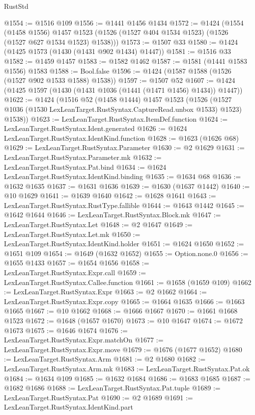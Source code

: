 \begin{lexlean}{RustStd}
\begin{coremodule}
@1554 := @1516 @109
@1556 := @1441 @1456 @1434
@1572 := @1424
    (@1554
      (@1458 @1556)
      @1457
      @1523
      (@1526 (@1527 @404 @1534 @1523) (@1526 (@1527 @627 @1534 @1523) @1538)))
@1573 := @1507 @33
@1580 := @1424 (@1425 @1573 (@1430 (@1431 @902 @1434) @1447))
@1581 := @1516 @33
@1582 := @1459 @1457
@1583 := @1582 @1462
@1587 := @1581 (@1441 @1583 @1556) @1583
@1588 := Bool.false
@1596 := @1424 (@1587 @1588 (@1526 (@1527 @902 @1533 @1588) @1538))
@1597 := @1507 @52
@1607 := @1424 (@1425 @1597 (@1430 (@1431 @1036 (@1441 (@1471 @1456) @1434)) @1447))
@1622 := @1424
    (@1516
      @52
      (@1458 @1444)
      @1457
      @1523
      (@1526 (@1527 @1036 (@1530 LexLeanTarget.RustSyntax.CaptureRead.unbox @1533) @1523) @1538))
@1623 := LexLeanTarget.RustSyntax.ItemDef.function
@1624 := LexLeanTarget.RustSyntax.Ident.generated
@1626 := @1624 LexLeanTarget.RustSyntax.IdentKind.function
@1628 := @1623 (@1626 @68)
@1629 := LexLeanTarget.RustSyntax.Parameter
@1630 := @2 @1629
@1631 := LexLeanTarget.RustSyntax.Parameter.mk
@1632 := LexLeanTarget.RustSyntax.Pat.bind
@1634 := @1624 LexLeanTarget.RustSyntax.IdentKind.binding
@1635 := @1634 @68
@1636 := @1632 @1635
@1637 := @1631 @1636
@1639 := @1630 (@1637 @1442)
@1640 := @10 @1629
@1641 := @1639 @1640
@1642 := @1628 @1641
@1643 := LexLeanTarget.RustSyntax.RustType.fallible
@1644 := @1643 @1442
@1645 := @1642 @1644
@1646 := LexLeanTarget.RustSyntax.Block.mk
@1647 := LexLeanTarget.RustSyntax.Let
@1648 := @2 @1647
@1649 := LexLeanTarget.RustSyntax.Let.mk
@1650 := LexLeanTarget.RustSyntax.IdentKind.holder
@1651 := @1624 @1650
@1652 := @1651 @109
@1654 := @1649 (@1632 @1652)
@1655 := Option.none.{0}
@1656 := @1655 @1433
@1657 := @1654 @1656
@1658 := LexLeanTarget.RustSyntax.Expr.call
@1659 := LexLeanTarget.RustSyntax.Callee.function
@1661 := @1658 (@1659 @109)
@1662 := LexLeanTarget.RustSyntax.Expr
@1663 := @2 @1662
@1664 := LexLeanTarget.RustSyntax.Expr.copy
@1665 := @1664 @1635
@1666 := @1663 @1665
@1667 := @10 @1662
@1668 := @1666 @1667
@1670 := @1661 @1668 @1523
@1672 := @1648 (@1657 @1670)
@1673 := @10 @1647
@1674 := @1672 @1673
@1675 := @1646 @1674
@1676 := LexLeanTarget.RustSyntax.Expr.matchOn
@1677 := LexLeanTarget.RustSyntax.Expr.move
@1679 := @1676 (@1677 @1652)
@1680 := LexLeanTarget.RustSyntax.Arm
@1681 := @2 @1680
@1682 := LexLeanTarget.RustSyntax.Arm.mk
@1683 := LexLeanTarget.RustSyntax.Pat.ok
@1684 := @1634 @109
@1685 := @1632 @1684
@1686 := @1683 @1685
@1687 := @1682 @1686
@1688 := LexLeanTarget.RustSyntax.Pat.tuple
@1689 := LexLeanTarget.RustSyntax.Pat
@1690 := @2 @1689
@1691 := LexLeanTarget.RustSyntax.IdentKind.part

\end{coremodule}
\end{lexlean}
